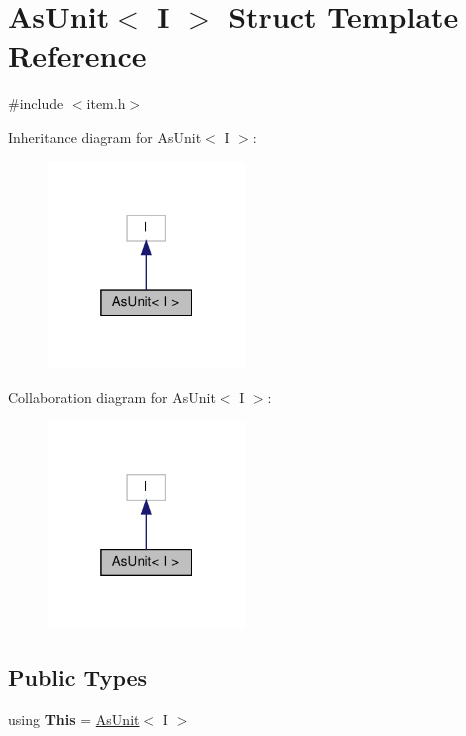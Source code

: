 \hypertarget{structAsUnit}{}\section{As\+Unit$<$ I $>$ Struct Template Reference}
\label{structAsUnit}


{\ttfamily \#include $<$item.\+h$>$}



Inheritance diagram for As\+Unit$<$ I $>$\+:\nopagebreak
\begin{figure}[H]
\begin{center}
\leavevmode
\includegraphics[width=148pt]{structAsUnit__inherit__graph}
\end{center}
\end{figure}


Collaboration diagram for As\+Unit$<$ I $>$\+:\nopagebreak
\begin{figure}[H]
\begin{center}
\leavevmode
\includegraphics[width=148pt]{structAsUnit__coll__graph}
\end{center}
\end{figure}
\subsection*{Public Types}
\begin{DoxyCompactItemize}
\item 
\mbox{\label{structAsUnit_a025932fdf9b0f80c22edfd96d9cc28a5}} 
using {\bfseries This} = \hyperlink{structAsUnit}{As\+Unit}$<$ I $>$
\end{DoxyCompactItemize}
